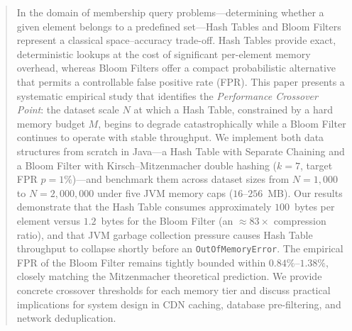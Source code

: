 \begin{abstract}
In the domain of membership query problems---determining whether a given element belongs to a predefined set---Hash Tables and Bloom Filters represent a classical space--accuracy trade-off. Hash Tables provide exact, deterministic lookups at the cost of significant per-element memory overhead, whereas Bloom Filters offer a compact probabilistic alternative that permits a controllable false positive rate (FPR). This paper presents a systematic empirical study that identifies the \emph{Performance Crossover Point}: the dataset scale $N$ at which a Hash Table, constrained by a hard memory budget $M$, begins to degrade catastrophically while a Bloom Filter continues to operate with stable throughput. We implement both data structures from scratch in Java---a Hash Table with Separate Chaining and a Bloom Filter with Kirsch--Mitzenmacher double hashing ($k=7$, target FPR $p=1\%$)---and benchmark them across dataset sizes from $N = 1{,}000$ to $N = 2{,}000{,}000$ under five JVM memory caps ($16$--$256$~MB). Our results demonstrate that the Hash Table consumes approximately $100$~bytes per element versus $1.2$~bytes for the Bloom Filter (an ${\approx}83\times$ compression ratio), and that JVM garbage collection pressure causes Hash Table throughput to collapse shortly before an \texttt{OutOfMemoryError}. The empirical FPR of the Bloom Filter remains tightly bounded within $0.84\%$--$1.38\%$, closely matching the Mitzenmacher theoretical prediction. We provide concrete crossover thresholds for each memory tier and discuss practical implications for system design in CDN caching, database pre-filtering, and network deduplication.
\end{abstract}
